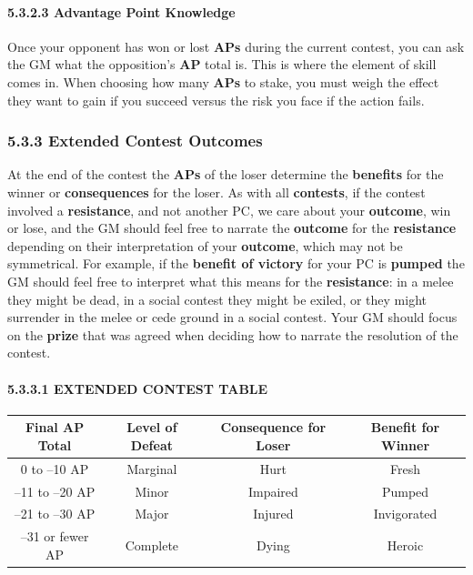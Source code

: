 \documentclass[
]{article}
\begin{document}
\hypertarget{advantage-point-knowledge}{%
\paragraph{5.3.2.3 Advantage Point
Knowledge}\label{advantage-point-knowledge}}

Once your opponent has won or lost \textbf{APs} during the current
contest, you can ask the GM what the opposition's \textbf{AP} total is.
This is where the element of skill comes in. When choosing how many
\textbf{APs} to stake, you must weigh the effect they want to gain if
you succeed versus the risk you face if the action fails.

\hypertarget{extended-contest-outcomes}{%
\subsubsection{5.3.3 Extended Contest
Outcomes}\label{extended-contest-outcomes}}

At the end of the contest the \textbf{APs} of the loser determine the
\textbf{benefits} for the winner or \textbf{consequences} for the loser.
As with all \textbf{contests}, if the contest involved a
\textbf{resistance}, and not another PC, we care about your
\textbf{outcome}, win or lose, and the GM should feel free to narrate
the \textbf{outcome} for the \textbf{resistance} depending on their
interpretation of your \textbf{outcome}, which may not be symmetrical.
For example, if the \textbf{benefit of victory} for your PC is
\textbf{pumped} the GM should feel free to interpret what this means for
the \textbf{resistance}: in a melee they might be dead, in a social
contest they might be exiled, or they might surrender in the melee or
cede ground in a social contest. Your GM should focus on the
\textbf{prize} that was agreed when deciding how to narrate the
resolution of the contest.

\hypertarget{extended-contest-table-1}{%
\paragraph{5.3.3.1 EXTENDED CONTEST
TABLE}\label{extended-contest-table-1}}

\begin{longtable}[]{@{}cccc@{}}
\toprule
Final AP Total & Level of Defeat & Consequence for Loser & Benefit for
Winner\tabularnewline
\midrule
\endhead
0 to --10 AP & Marginal & Hurt & Fresh\tabularnewline
--11 to --20 AP & Minor & Impaired & Pumped\tabularnewline
--21 to --30 AP & Major & Injured & Invigorated\tabularnewline
--31 or fewer AP & Complete & Dying & Heroic\tabularnewline
\bottomrule
\end{longtable}
\end{document}
